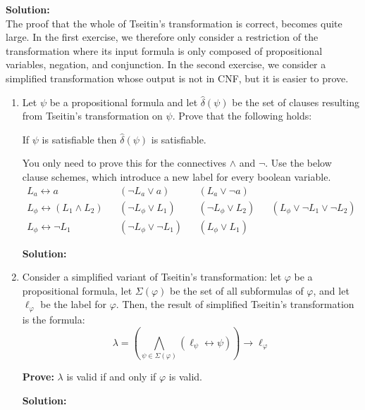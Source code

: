 \documentclass[11pt,a4paper]{uebung}
\newcommand{\solution}[1]{\par {\bf Solution:}\\#1}
\begin{document}
\solution{
}


The proof that the whole of Tseitin's transformation is correct, becomes quite
large. In the first exercise, we therefore only consider a restriction of the
transformation where its input formula is only composed of propositional
variables, negation, and conjunction.
In the second exercise, we consider a simplified transformation whose output
is not in CNF, but it is easier to prove.

\begin{enumerate}

\item Let $\psi$ be a propositional formula and let $\hat{\delta}(\psi)$ be the set
  of clauses resulting from Tseitin's transformation on $\psi$. Prove that the
  following holds:
  
  \centerline{If $\psi$ is satisfiable then $\hat{\delta}(\psi)$ is satisfiable.}

  You only need to prove this for the connectives $\land$ and $\neg$.
  Use the below clause schemes, which introduce a new label for every boolean
  variable.
  \begin{align*}
    L_a \leftrightarrow a && (\neg L_a \lor a)&& (L_a \lor \neg a)\\
    L_\phi \leftrightarrow (L_1 \land L_2) && (\neg L_\phi \lor L_1)&& (\neg
    L_\phi \lor L_2)&& (L_\phi \lor \neg L_1 \lor \neg L_2)\\
    L_\phi \leftrightarrow \neg L_1 && (\neg L_\phi \lor \neg L_1)&& (L_\phi
    \lor L_1)
  \end{align*}
  
\solution{

}

  \item
Consider a simplified variant of Tseitin's transformation: let $\varphi$ be a
propositional formula, let $\Sigma(\varphi)$ be the set of all subformulas of
$\varphi$, and let $\ell_{\varphi}$ be the label for $\varphi$. Then, the
result of simplified Tseitin's transformation is the formula:
\begin{displaymath}
  \lambda = \left( \bigwedge_{\psi\in \Sigma(\varphi)} \left( \ell_{\psi}
      \leftrightarrow \psi \right) \right) \rightarrow \ell_{\varphi}
\end{displaymath}

{\bf Prove:} $\lambda$ is valid if and only if $\varphi$ is valid.

\solution{

}

\end{enumerate}
\end{document}
